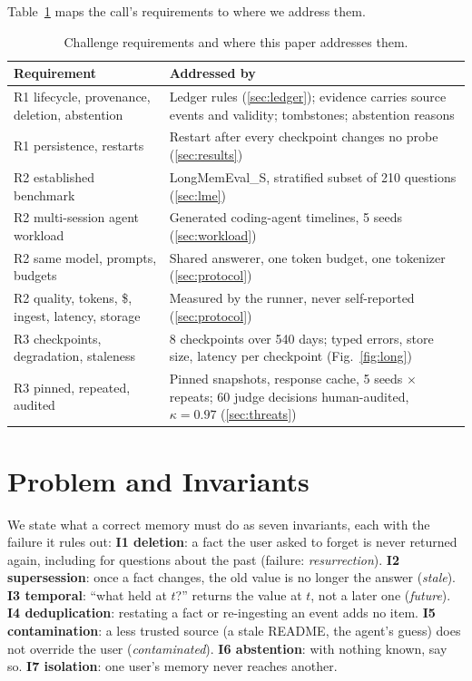 \documentclass[10pt,conference]{IEEEtran}
\begin{document}
Table~\ref{tab:req} maps the call's requirements to where we address them.

\begin{table}[t]
\caption{Challenge requirements and where this paper addresses them.}
\label{tab:req}
\centering
\footnotesize
\begin{tabular}{@{}p{}p{}@{}}
\toprule
Requirement & Addressed by \\
\midrule
R1 lifecycle, provenance, deletion, abstention & Ledger rules (\ref{sec:ledger}); evidence carries source events and validity; tombstones; abstention reasons \\
R1 persistence, restarts & Restart after every checkpoint changes no probe (\ref{sec:results}) \\
R2 established benchmark & LongMemEval\_S, stratified subset of 210 questions (\ref{sec:lme}) \\
R2 multi-session agent workload & Generated coding-agent timelines, 5 seeds (\ref{sec:workload}) \\
R2 same model, prompts, budgets & Shared answerer, one token budget, one tokenizer (\ref{sec:protocol}) \\
R2 quality, tokens, \$, ingest, latency, storage & Measured by the runner, never self-reported (\ref{sec:protocol}) \\
R3 checkpoints, degradation, staleness & 8 checkpoints over 540 days; typed errors, store size, latency per checkpoint (Fig.~\ref{fig:long}) \\
R3 pinned, repeated, audited & Pinned snapshots, response cache, 5 seeds $\times$ repeats; 60 judge decisions human-audited, $\kappa=0.97$ (\ref{sec:threats}) \\
\bottomrule
\end{tabular}
\end{table}

\section{Problem and Invariants}
\label{sec:problem}

We state what a correct memory must do as seven invariants, each with the
failure it rules out:
\textbf{I1 deletion}: a fact the user asked to forget is never returned again,
including for questions about the past (failure: \emph{resurrection}).
\textbf{I2 supersession}: once a fact changes, the old value is no longer the
answer (\emph{stale}).
\textbf{I3 temporal}: ``what held at $t$?'' returns the value at $t$, not a
later one (\emph{future}).
\textbf{I4 deduplication}: restating a fact or re-ingesting an event adds no
item.
\textbf{I5 contamination}: a less trusted source (a stale README, the agent's
guess) does not override the user (\emph{contaminated}).
\textbf{I6 abstention}: with nothing known, say so.
\textbf{I7 isolation}: one user's memory never reaches another.
\end{document}
